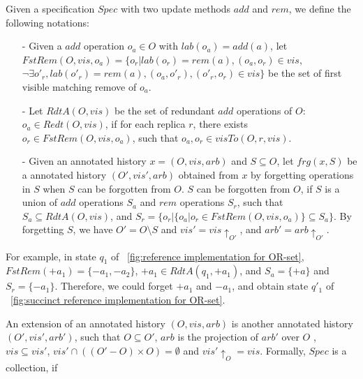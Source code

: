 Given a specification $\mathit{Spec}$ with two update methods $\mathit{add}$ and $\mathit{rem}$, we define the following notations:  

\begin{itemize}
\setlength{\itemsep}{0.5pt}
\item[-] Given a $\mathit{add}$ operation $o_a \in O$ with $lab(o_a)= \mathit{add}(a)$, let $\mathit{FstRem}(O,\mathit{vis},o_a) = \{ o_r \vert lab(o_r)=\mathit{rem}(a),(o_a,o_r) \in \mathit{vis}$, $ \neg \exists o'_r, lab(o'_r) = rem(a), (o_a,o'_r),(o'_r,o_r) \in \mathit{vis} \}$ be the set of first visible matching remove of $o_a$. 

\item[-] Let $\mathit{RdtA}(O,\mathit{vis})$ be the set of redundant $add$ operations of $O$: $o_a\in \mathit{Redt}(O,\mathit{vis})$, if for each replica $r$, there exists $o_r \in \mathit{FstRem}(O,\mathit{vis},o_a)$, such that $o_a,o_r \in \mathit{visTo}(O,r,\mathit{vis})$. 

\item[-] Given an annotated history $x = (O,\mathit{vis},\mathit{arb})$ and $S \subseteq O$, let $\mathit{frg}(x,S)$ be a annotated history $(O',\mathit{vis}',\mathit{arb})$ obtained from $x$ by forgetting operations in $S$ when $S$ can be forgotten from $O$. $S$ can be forgotten from $O$, if $S$ is a union of $\mathit{add}$ operations $S_a$ and $\mathit{rem}$ operations $S_r$, such that $S_a \subseteq \mathit{RdtA}(O,\mathit{vis})$, and $S_r = \{ o_r \vert  \{ o_a \vert o_r \in \mathit{FstRem}(O,\mathit{vis},o_a) \} \subseteq S_a \}$. By forgetting $S$, we have $O' = O \setminus S$ and $\mathit{vis}' = \mathit{vis} \uparrow_{O'}$, and $\mathit{arb}' = \mathit{arb} \uparrow_{O'}$.
\end{itemize} 

{\color {red} For example, in state $q_1$ of \figurename~\ref{fig:reference implementation for OR-set}, $\mathit{FstRem}(+a_1) = \{ -a_1,-a_2 \}$, $+a_1 \in \mathit{RdtA}(q_1,+a_1)$, and $S_a = \{ +a \}$ and $S_r = \{ -a_1 \}$. Therefore, we could forget $+a_1$ and $-a_1$, and obtain state $q'_1$ of \figurename~\ref{fig:succinct reference implementation for OR-set}.}  

An extension of an annotated history $(O,\mathit{vis},\mathit{arb})$ is another annotated history $(O',\mathit{vis}',\mathit{arb}')$, such that $O \subseteq O'$, $\mathit{arb}$ is the projection of $\mathit{arb}'$ over $O$ , $\mathit{vis} \subseteq \mathit{vis}'$, $\mathit{vis}' \cap ( (O'-O) \times O ) = \emptyset$ and $\mathit{vis}' \uparrow_{O} = \mathit{vis}$. {\color {red}Formally, $\mathit{Spec}$ is a collection, if} 

